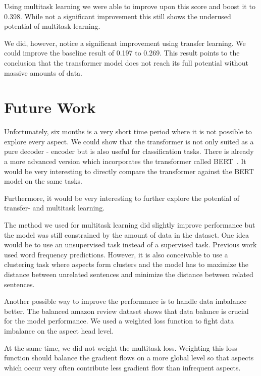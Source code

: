 Using multitask learning we were able to improve upon this score and boost it to 0.398. While not a significant improvement this still shows the underused potential of multitask learning.
\medskip

We did, however, notice a significant improvement using transfer learning. We could improve the baseline result of 0.197 to 0.269. This result points to the conclusion that the transformer model does not reach its full potential without massive amounts of data.


\section{Future Work}

Unfortunately, six months is a very short time period where it is not possible to explore every aspect. We could show that the transformer is not only suited as a pure decoder - encoder but is also useful for classification tasks. There is already a more advanced version which incorporates the transformer called BERT~\cite{Devlin2018a}. It would be very interesting to directly compare the transformer against the BERT model on the same tasks.
\medskip

Furthermore, it would be very interesting to further explore the potential of transfer- and multitask learning.
\smallskip

The method we used for multitask learning did slightly improve performance but the model was still constrained by the amount of data in the dataset. One idea would be to use an unsupervised task instead of a supervised task. Previous work used word frequency predictions. However, it is also conceivable to use a clustering task where aspects form clusters and the model has to maximize the distance between unrelated sentences and minimize the distance between related sentences.
\medskip

Another possible way to improve the performance is to handle data imbalance better. The balanced amazon review dataset shows that data balance is crucial for the model performance. We used a weighted loss function to fight data imbalance on the aspect head level.
\smallskip

At the same time, we did not weight the multitask loss. Weighting this loss function should balance the gradient flows on a more global level so that aspects which occur very often contribute less gradient flow than infrequent aspects.